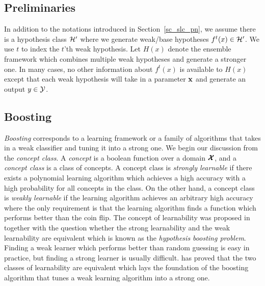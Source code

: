 {%
%
\subsection{Preliminaries} \label{sc_em_pn}

In addition to the notations introduced in Section~\ref{sc_slc_pn}, we assume there is a hypothesis class $\mathcal{H}'$ where we generate weak/base hypotheses $f^t(x)\in\mathcal{H}'$.
We use $t$ to index the $t$'th weak hypothesis.
Let $H(x)$ denote the ensemble framework which combines multiple weak hypotheses and generate a stronger one.
In many cases, no other information about $f^t(x)$ is available to $H(x)$ except that each weak hypothesis will take in a parameter $\mathbf {x}$ and generate an output $y\in\mathcal{Y}$.


\subsection{Boosting} \label{sc_boosting}

\textit{Boosting} corresponds to a learning framework or a family of algorithms that takes in a weak classifier and tuning it into a strong one.
We begin our discussion from the \textit{concept class}.
A \textit{concept} is a boolean function over a domain $\pmb {\mathcal{X}}$, and a \textit{concept class} is a class of concepts.
A concept class is \textit{strongly learnable} if there exists a polynomial learning algorithm which achieves a high accuracy with a high probability for all concepts in the class.
On the other hand, a concept class is \textit{weakly learnable} if the learning algorithm achieves an arbitrary high accuracy where the only requirement is that the learning algorithm finds a function which performs better than the coin flip.
The concept of learnability was proposed in \citep{Kearns94cryptographic} together with the question whether the strong learnability and the weak learnability are equivalent which is known as the \textit{hypothesis boosting problem}.
Finding a weak learner which performs better than random guessing is easy in practice, but finding a strong learner is usually difficult.
\citet{Schapire90the} has proved that the two classes of learnability are equivalent which lays the foundation of the boosting algorithm that tunes a weak learning algorithm into a strong one.

}
